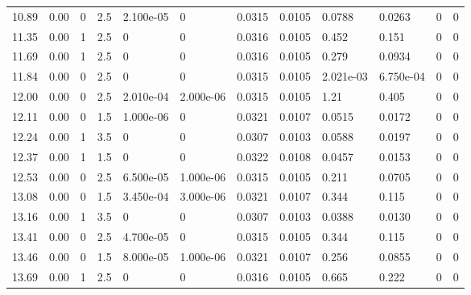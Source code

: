\documentclass[preview]{standalone}
\begin{document}
{{\begin{tabular}{L{1.2cm}C{1.2cm} C{0.3cm}C{0.5cm} C{1.4cm}C{1.4cm} C{1.4cm}C{1.4cm} C{1.6cm}C{1.6cm} C{1.6cm}C{1.6cm}}
  10.89  &  0.00  & 0     & 2.5 &  2.100e-05  & 0  &  0.0315&   0.0105& 0.0788 & 0.0263   &  0 & 0  \\ 
  11.35  &  0.00  & 1     & 2.5 &  0  & 0  &  0.0316&   0.0105& 0.452 & 0.151   &  0 & 0  \\ 
  11.69  &  0.00  & 1     & 2.5 &  0  & 0  &  0.0316&   0.0105& 0.279 & 0.0934   &  0 & 0  \\ 
  11.84  &  0.00  & 0     & 2.5 &  0  & 0  &  0.0315&   0.0105& 2.021e-03 & 6.750e-04   &  0 & 0  \\ 
  12.00  &  0.00  & 0     & 2.5 &  2.010e-04  & 2.000e-06  &  0.0315&   0.0105& 1.21 & 0.405   &  0 & 0  \\ 
  12.11  &  0.00  & 0     & 1.5 &  1.000e-06  & 0  &  0.0321&   0.0107& 0.0515 & 0.0172   &  0 & 0  \\ 
  12.24  &  0.00  & 1     & 3.5 &  0  & 0  &  0.0307&   0.0103& 0.0588 & 0.0197   &  0 & 0  \\ 
  12.37  &  0.00  & 1     & 1.5 &  0  & 0  &  0.0322&   0.0108& 0.0457 & 0.0153   &  0 & 0  \\ 
  12.53  &  0.00  & 0     & 2.5 &  6.500e-05  & 1.000e-06  &  0.0315&   0.0105& 0.211 & 0.0705   &  0 & 0  \\ 
  13.08  &  0.00  & 0     & 1.5 &  3.450e-04  & 3.000e-06  &  0.0321&   0.0107& 0.344 & 0.115   &  0 & 0  \\ 
  13.16  &  0.00  & 1     & 3.5 &  0  & 0  &  0.0307&   0.0103& 0.0388 & 0.0130   &  0 & 0  \\ 
  13.41  &  0.00  & 0     & 2.5 &  4.700e-05  & 0  &  0.0315&   0.0105& 0.344 & 0.115   &  0 & 0  \\ 
  13.46  &  0.00  & 0     & 1.5 &  8.000e-05  & 1.000e-06  &  0.0321&   0.0107& 0.256 & 0.0855   &  0 & 0  \\ 
  13.69  &  0.00  & 1     & 2.5 &  0  & 0  &  0.0316&   0.0105& 0.665 & 0.222   &  0 & 0  \\ 
\hline 
\end{tabular} 

}}
\end{document}
